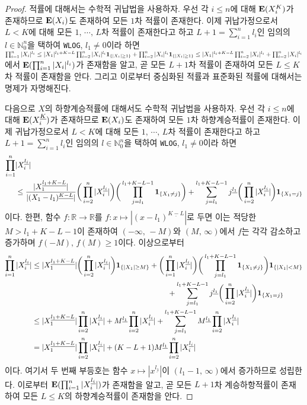 \begin{proof}
    적률에 대해서는 수학적 귀납법을 사용하자. 우선 각 $i\leq n$에 대해 $\mathbf{E}(X_i^K)$가 존재하므로 $\mathbf{E}(X_i)$도 존재하여 모든 $1$차 적률이 존재한다. 이제 귀납가정으로서 $L<K$에 대해 모든 $1,\,\cdots,\,L$차 적률이 존재한다고 하고 $L+1=\sum_{i=1}^nl_i$인 임의의 $l\in\mathbb{N}_0^n$을 택하여 \texttt{WLOG}, $l_1\ne0$이라 하면 $\prod_{i=1}^n|X_i|^{l_i}\leq|X_1|^{l_1+K-L}\prod_{i=2}^n|X_i|^{l_i}\mathbf{1}_{\{|X_1|\geq1\}}+\prod_{i=2}^n|X_i|^{l_i}\mathbf{1}_{\{|X_1|\geq1\}}\leq|X_1|^{l_1+K-L}\prod_{i=2}^n|X_i|^{l_i}+\prod_{i=2}^n|X_i|^{l_i}$에서 $\mathbf{E}(\prod_{i=1}^n|X_i|^{l_i})$가 존재함을 알고, 곧 모든 $L+1$차 적률이 존재하여 모든 $L\leq K$차 적률이 존재함을 안다. 그리고 이로부터 중심화된 적률과 표준화된 적률에 대해서는 명제가 자명해진다.

    다음으로 $X$의 하향계승적률에 대해서도 수학적 귀납법을 사용하자. 우선 각 $i\leq n$에 대해 $\mathbf{E}(X_i^{\underline{K}})$가 존재하므로 $\mathbf{E}(X_i)$도 존재하여 모든 $1$차 하향계승적률이 존재한다. 이제 귀납가정으로서 $L<K$에 대해 모든 $1,\,\cdots,\,L$차 적률이 존재한다고 하고 $L+1=\sum_{i=1}^nl_i$인 임의의 $l\in\mathbb{N}_0^n$을 택하여 \texttt{WLOG}, $l_1\ne0$이라 하면
    \begin{align*}
        \prod_{i=1}^n&|X_i^{\underline{l_i}}|\\
        &\leq\frac{|X_1^{\underline{l_1+K-L}}|}{|(X_1-l_1)^{\underline{K-L}}|}\bigg(\prod_{i=2}^n|X_i^{\underline{l_i}}|\bigg)\bigg(\prod_{j=l_1}^{l_1+K-L-1}\mathbf{1}_{\{X_1\ne j\}}\bigg)+\sum_{j=l_1}^{l_1+K-L-1}j^{\underline{l_1}}\bigg(\prod_{i=2}^n|X_i^{\underline{l_i}}|\bigg)\mathbf{1}_{\{X_1=j\}}
    \end{align*}
    이다. 한편, 함수 $f:\mathbb{R}\to\mathbb{R}$를 $f:x\mapsto|(x-l_1)^{\underline{K-L}}|$로 두면 이는 적당한 $M>l_1+K-L-1$이 존재하여 $(-\infty,\,-M)$와 $(M,\,\infty)$에서 $f$는 각각 감소하고 증가하며 $f(-M),\,f(M)\geq1$이다. 이상으로부터
    \begin{align*}
        \prod_{i=1}^n|X_i^{\underline{l_i}}|&\leq|X_1^{\underline{l_1+K-L}}|\bigg(\prod_{i=2}^n|X_i^{\underline{l_i}}|\bigg)\mathbf{1}_{\{|X_1|\geq M\}}+\bigg(\prod_{i=1}^n|X_i^{\underline{l_i}}|\bigg)\bigg(\prod_{j=l_1}^{l_1+K-L-1}\mathbf{1}_{\{X_1\ne j\}}\bigg)\mathbf{1}_{\{|X_1|<M\}}\\
        &\qquad\qquad\qquad\qquad\qquad\qquad\qquad\qquad\qquad+\sum_{j=l_1}^{l_1+K-L-1}j^{\underline{l_1}}\bigg(\prod_{i=2}^n|X_i^{\underline{l_i}}|\bigg)\mathbf{1}_{\{X_1=j\}}\\
        &\leq|X_1^{\underline{l_1+K-L}}|\prod_{i=2}^n|X_i^{\underline{l_i}}|+M^{\underline{l_1}}\prod_{i=2}^n|X_i^{\underline{l_i}}|+\sum_{j=l_1}^{l_1+K-L-1}M^{\underline{l_1}}\prod_{i=2}^n|X_i^{\underline{l_i}}|\\
        &=|X_1^{\underline{l_1+K-L}}|\prod_{i=2}^n|X_i^{\underline{l_i}}|+(K-L+1)M^{\underline{l_1}}\prod_{i=2}^n|X_i^{\underline{l_i}}|
    \end{align*}
    이다. 여기서 두 번째 부등호는 함수 $x\mapsto|x^{\underline{l_1}}|$이 $(l_1-1,\,\infty)$에서 증가하므로 성립한다. 이로부터 $\mathbf{E}(\prod_{i=1}^n|X_i^{\underline{l_i}}|)$가 존재함을 알고, 곧 모든 $L+1$차 계승하항적률이 존재하여 모든 $L\leq K$의 하향계승적률이 존재함을 안다.
\end{proof}

